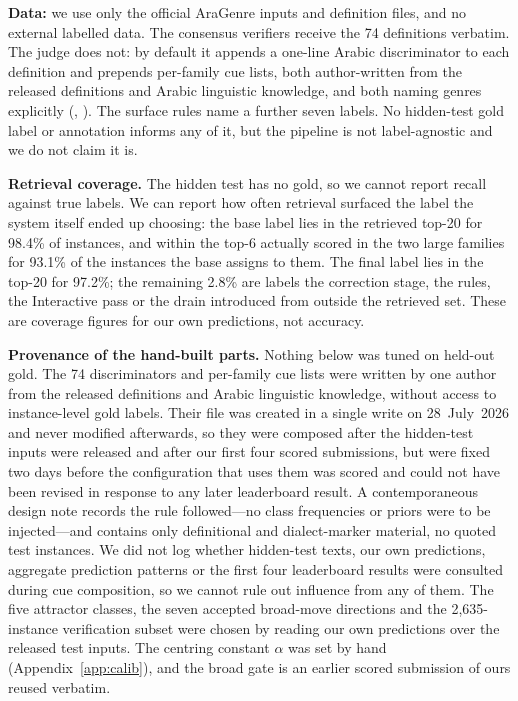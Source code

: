 \documentclass[11pt]{article}
\begin{document}
\textbf{Data:} we use only the
official AraGenre inputs and definition files, and no external labelled data. The consensus
verifiers receive the 74 definitions verbatim. The judge does not: by default it appends a
one-line Arabic discriminator to each definition and prepends per-family cue lists, both
author-written from the released definitions and Arabic linguistic knowledge, and both naming
genres explicitly (, ). The surface rules
name a further seven labels. No hidden-test gold label or annotation informs any of it, but the pipeline is
not label-agnostic and we do not claim it is.

\textbf{Retrieval coverage.} The hidden test has no gold, so we cannot report recall against
true labels. We can report how often retrieval surfaced the label the system itself ended up
choosing: the base label lies in the retrieved top-20 for 98.4\% of instances, and within the
top-6 actually scored in the two large families for 93.1\% of the instances the base assigns to
them. The final label lies in the top-20 for 97.2\%; the remaining 2.8\% are labels the
correction stage, the rules, the Interactive pass or the drain introduced from outside the
retrieved set. These are coverage
figures for our own predictions, not accuracy.

\textbf{Provenance of the hand-built parts.} Nothing below was tuned on held-out gold. The 74
discriminators and per-family cue lists were written by one author from the released
definitions and Arabic linguistic knowledge, without access to instance-level gold labels. Their file was created in a
single write on 28~July~2026 and never modified afterwards, so they were composed after the
hidden-test inputs were released and after our first four scored submissions, but were fixed two
days before the configuration that uses them was scored and could not have been revised in
response to any later leaderboard result. A contemporaneous design note records the rule
followed---no class frequencies or priors were to be injected---and contains only definitional
and dialect-marker material, no quoted test instances. We did not log whether hidden-test texts, our own
predictions, aggregate prediction patterns or the first four leaderboard results were consulted
during cue composition, so we cannot rule out influence from any of them. The five attractor classes, the seven accepted broad-move directions and the
2{,}635-instance verification subset were chosen by reading our own predictions over the
released test inputs. The centring constant $\alpha$ was set by hand (Appendix~\ref{app:calib}), and the broad gate is an earlier scored submission
of ours reused verbatim.
\end{document}
